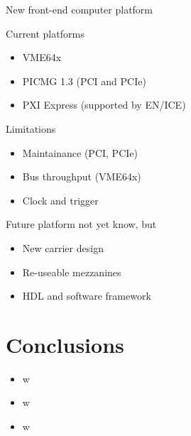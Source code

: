 \documentclass[compress,red]{beamer}
\begin{document}
\begin{frame}{New front-end computer platform}

  \begin{block}{Current platforms}
    \begin{itemize}
    \item VME64x
    \item PICMG 1.3 (PCI and PCIe)
    \item PXI Express (supported by EN/ICE)
    \end{itemize}
  \end{block}

  \begin{block}{Limitations}
    \begin{itemize}
    \item Maintainance (PCI, PCIe)
    \item Bus throughput (VME64x)
    \item Clock and trigger
    \end{itemize}
  \end{block}

  \begin{block}{Future platform not yet know, but}
    \begin{itemize}
    \item New carrier design
    \item Re-useable mezzanines
    \item HDL and software framework
    \end{itemize}
  \end{block}

\end{frame}


\section{Conclusions}

\begin{frame}{}

  \begin{block}{}
    \begin{itemize}
    \item w
    \item w
    \item w
    \end{itemize}
  \end{block}

\end{frame}
\end{document}
